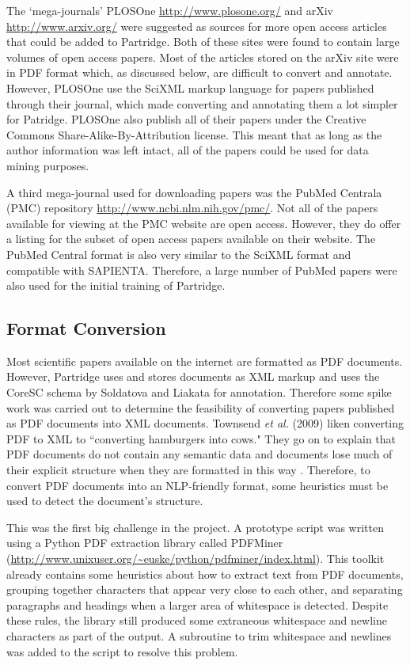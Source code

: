 The `mega-journals' PLOSOne \url{http://www.plosone.org/} and arXiv
\url{http://www.arxiv.org/} were suggested as sources for more open access
articles that could be added to Partridge. Both of these sites were found to
contain large volumes of open access papers. Most of the articles stored on the
arXiv site were in PDF format which, as discussed below, are difficult to
convert and annotate. However, PLOSOne use the SciXML markup language for
papers published through their journal, which made converting and annotating
them a lot simpler for Patridge. PLOSOne also publish all of their papers under
the Creative Commons Share-Alike-By-Attribution license\cite{ccbyattr}. This
meant that as long as the author information was left intact, all of the papers
could be used for data mining purposes.

A third mega-journal used for downloading papers was the PubMed Centrala (PMC)
repository \url{http://www.ncbi.nlm.nih.gov/pmc/}. Not all of
the papers available for viewing at the PMC website are open access. However,
they do offer a listing for the subset of open access papers available on their
website. The PubMed Central format is also very similar to the SciXML format
and compatible with SAPIENTA. Therefore, a large number of PubMed papers were
also used for the initial training of Partridge.

\subsection{Format Conversion} Most scientific papers available on the internet
are formatted as PDF documents. However, Partridge uses and stores documents as
XML markup and uses the CoreSC schema by Soldatova and
Liakata\cite{liakata2008guidelines} for annotation. Therefore some spike work
was carried out to determine the feasibility of converting papers published as
PDF documents into XML documents. Townsend \emph{et al.} (2009) liken
converting PDF to XML to ``converting hamburgers into cows." They go on to
explain that PDF documents do not contain any semantic data and documents lose
much of their explicit structure when they are formatted in this way
\cite{Townsend2009}.  Therefore, to convert PDF documents into an NLP-friendly
format, some heuristics must be used to detect the document's
structure\cite{pdfminer}.

This was the first big challenge in the project. A prototype script was written
using a Python PDF extraction library called PDFMiner
(\url{http://www.unixuser.org/~euske/python/pdfminer/index.html}).  This
toolkit already contains some heuristics about how to extract text from PDF
documents, grouping together characters that appear very close to each other,
and separating paragraphs and headings when a larger area of whitespace is
detected\cite{pdfminer}. Despite these rules, the library still produced some
extraneous whitespace and newline characters as part of the output. A
subroutine to trim whitespace and newlines was added to the script to resolve
this problem. 


